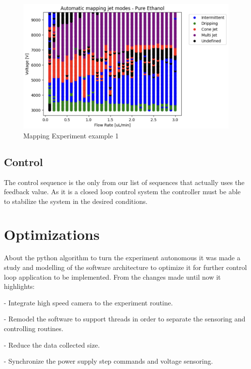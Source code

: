     \begin{figure}[H]
        \center
        \includegraphics[width=15cm]{Figuras/report4/map-2023-03-02.png}
        \caption{Mapping Experiment example 1}
        \label{fig:map3Data_fig}
    \end{figure}



\subsection{Control}

    The control sequence is the only from our list of sequences that actually uses the feedback value. 
    As it is a closed loop control system the controller must be able to stabilize the system in the desired conditions.



\section{Optimizations}
\label{sec:routine_optimization}

About the python algorithm to turn the experiment autonomous it was made a study and modelling of the software architecture to optimize it for further control loop application to be implemented. From the changes made until now it highlights:

- Integrate high speed camera to the experiment routine.

- Remodel the software to support threads in order to separate the sensoring and controlling routines.

- Reduce the data collected size.

- Synchronize the power supply step commands and voltage sensoring.

